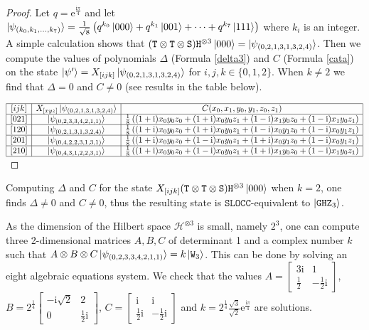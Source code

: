 \documentclass[a4paper,12pt,fleqn]{article}
\newcommand\SLOCC{\mathtt{SLOCC}}
\newcommand\W{\mathtt{W}}
\newcommand\GHZ{\mathtt{GHZ}}
\newcommand\HH{\mathcal{H}}
\newcommand\ee{\mathrm e}
\newcommand\ii{\mathrm i}
\begin{document}
  \begin{proof}
    Let $q=\ee^{\frac{\ii\pi}{4}}$ and let
    $\ket{\psi_{(k_0,k_1,\dots,k_7)}}=\frac{1}{\sqrt8}\left(q^{k_0}\ket{000}+q^{k_1}\ket{001}+\dots+q^{k_7}\ket{111}\right)$
    where $k_i$ is an integer. A simple calculation shows that $(\mathtt{T}\otimes\mathtt{T}\otimes\mathtt{S})\mathtt{H}^{\otimes 3}\ket{000}=\ket{\psi_{(0,2,1,3,1,3,2,4)}}$.
    Then we compute the values of polynomials $\Delta$ (Formula \eqref{delta3}) and $C$ (Formula \eqref{cata}) on the state $\ket{\psi'}=X_{[ijk]}\ket{\psi_{(0,2,1,3,1,3,2,4)}}$
    for $i,j,k\in\{0,1,2\}$. When $k\neq 2$ we find that $\Delta=0$ and $C\neq 0$ (see results in the table below). \medskip
    
  {\footnotesize
  $\begin{array}{|c|c|c|c|}\hline
     [ijk]&X_{[xyz]}\ket{\psi_{(0,2,1,3,1,3,2,4)}}&C(x_0,x_1,y_0,y_1,z_0,z_1)\\\hline
     [021]&\ket{\psi_{(0,2,3,3,4,2,1,1)}}&\frac18\left((1+\ii)x_0y_0z_0+(1+\ii) x_0y_0z_1+(1-\ii) x_1y_0z_0+(1-\ii) x_1y_0z_1\right)\\\hline
     [120]&\ket{\psi_{(0,2,1,3,1,3,2,4)}}&\frac18\left((1+\ii)x_0y_0z_0+(1+\ii) x_0y_0z_1+(1-\ii) x_0y_1z_0+(1-\ii) x_0y_1z_1\right)\\\hline
     [201]&\ket{\psi_{(0,4,2,2,3,1,3,1)}}&\frac18\left((1+\ii)x_0y_0z_0+(1-\ii) x_0y_0z_1+(1+\ii) x_0y_1z_0+(1-\ii) x_0y_1z_1\right)\\\hline
     [210]&\ket{\psi_{(0,4,3,1,2,2,3,1)}}&\frac18\left((1+\ii)x_0y_0z_0+(1-\ii) x_0y_0z_1+(1+\ii) x_1y_0z_0+(1-\ii) x_1y_0z_1\right)\\\hline
   \end{array}$}
 
\end{proof}

Computing $\Delta$ and $C$ for the state $X_{[ijk]}(\mathtt{T}\otimes\mathtt{T}\otimes\mathtt{S})\mathtt{H}^{\otimes 3}\ket{000}$ when $k=2$, one finds $\Delta\neq 0$ and $C\neq 0$, thus the resulting state is $\SLOCC$-equivalent to $\ket{\GHZ_3}$.\medskip

As the dimension of the Hilbert space $\HH^{\otimes3}$ is small, namely $2^3$, one can compute three 2-dimensional matrices $A,B,C$ of determinant 1  and a complex number $k$ such that $A\otimes B\otimes C\ket{\psi_{(0,2,3,3,4,2,1,1)}}=k\ket{\W_3}$. This can be done by solving an eight algebraic equations system. We check that the values
$A=\begin{bmatrix}3\ii&1\\\frac{1}{2}&-\frac{1}{2}\ii\end{bmatrix}$, $B=2^{\frac14}\begin{bmatrix}-\ii\sqrt{2}&2\\0&\frac{1}{2}\ii\end{bmatrix}$,
$C=\begin{bmatrix}\ii&\ii\\\frac{1}{2}\ii&-\frac{1}{2}\ii\end{bmatrix}$ and $k=2^{\frac14}\frac{\sqrt3}{\sqrt2}\ee^{\frac{\ii\pi}{4}}$ are solutions.
\end{document}

